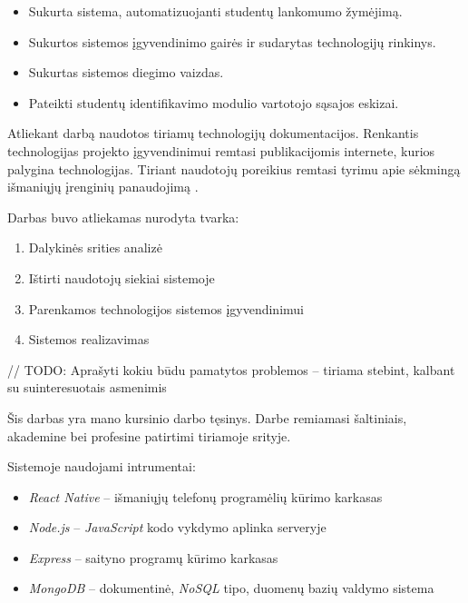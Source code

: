 \documentclass{VUMIFPSbakalaurinis}
\begin{document}

\begin{itemize}
	\item Sukurta sistema, automatizuojanti studentų lankomumo žymėjimą.
	\item Sukurtos sistemos įgyvendinimo gairės ir sudarytas technologijų rinkinys.
	\item Sukurtas sistemos diegimo vaizdas.
	\item Pateikti studentų identifikavimo modulio vartotojo sąsajos eskizai.
\end{itemize}


Atliekant darbą naudotos tiriamų technologijų dokumentacijos. Renkantis technologijas projekto įgyvendinimui remtasi publikacijomis internete, kurios palygina technologijas. Tiriant naudotojų poreikius remtasi tyrimu apie sėkmingą išmaniųjų įrenginių panaudojimą \cite{mhealth}.


Darbas buvo atliekamas nurodyta tvarka:

\begin{enumerate}
    \item Dalykinės srities analizė
    \item Ištirti naudotojų siekiai sistemoje
    \item Parenkamos technologijos sistemos įgyvendinimui
    \item Sistemos realizavimas
\end{enumerate}


// TODO: Aprašyti kokiu būdu pamatytos problemos – tiriama stebint, kalbant su suinteresuotais asmenimis


Šis darbas yra mano kursinio darbo tęsinys. Darbe remiamasi šaltiniais, akademine bei profesine patirtimi tiriamoje srityje.


Sistemoje naudojami intrumentai:

\begin{itemize}
    \item \textit{React Native} – išmaniųjų telefonų programėlių kūrimo karkasas
    \item \textit{Node.js} – \textit{JavaScript} kodo vykdymo aplinka serveryje
    \item \textit{Express} – saityno programų kūrimo karkasas
    \item \textit{MongoDB} – dokumentinė, \textit{NoSQL} tipo, duomenų bazių valdymo sistema
\end{itemize}
\end{document}
